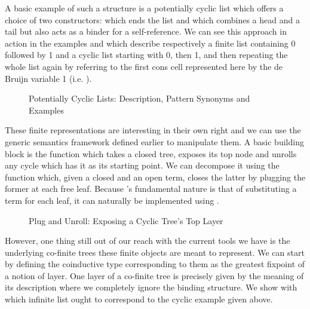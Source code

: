 A basic example of such a structure is a potentially cyclic list which
offers a choice of two constructors: \AIC{[]} which ends the list and
\AIC{\_:\!:\_} which combines a head and a tail but also acts as a binder
for a self-reference. We can see this approach in action in the examples
\AF{[0, 1]} and  which describe respectively a finite list containing
0 followed by 1 and a cyclic list starting with 0, then 1, and then
repeating the whole list again by referring to the first cons cell
represented here by the de Bruijn variable 1 (i.e.  ).

\begin{figure}[h]
\begin{minipage}{0.55\textwidth}
\end{minipage}\hspace{2em}
\begin{minipage}{0.35\textwidth}
\end{minipage}
\caption{Potentially Cyclic Lists: Description, Pattern Synonyms and Examples}
\end{figure}

These finite representations are interesting in their own right
and we can use the generic semantics framework defined earlier
to manipulate them. A basic building block is the 
function which takes a closed tree, exposes its top node and
unrolls any cycle which has it as its starting point. We can
decompose it using the  function which, given a closed
and an open term, closes the latter by plugging the former at
each free  leaf. Because 's fundamental nature
is that of substituting a term for each leaf, it can naturally
be implemented using .

\begin{figure}[h]
\begin{minipage}{0.52\textwidth}
\end{minipage}\hspace{2em}
\begin{minipage}{0.43\textwidth}
\end{minipage}
\caption{Plug and Unroll: Exposing a Cyclic Tree's Top Layer}
\end{figure}

However, one thing still out of our reach with the current tools we have
is the underlying co-finite trees these finite objects are meant
to represent. We can start by defining the coinductive type
corresponding to them as the greatest fixpoint of a notion of
layer. One layer of a co-finite tree is precisely given by the
meaning of its description where we completely ignore the binding
structure. We show with  which infinite list ought to
correspond to the cyclic example  given above.

